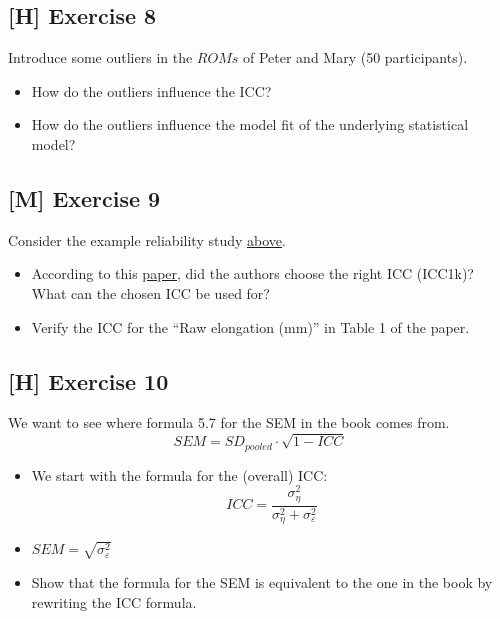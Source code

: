 \documentclass[
]{book}
\providecommand{\tightlist}{%
  \setlength{\itemsep}{0pt}\setlength{\parskip}{0pt}}
\begin{document}
\subsection{{[}H{]} Exercise 8}\label{exercise8}

Introduce some outliers in the \(ROMs\) of Peter and Mary (50 participants).

\begin{itemize}
\tightlist
\item
  How do the outliers influence the ICC?
\item
  How do the outliers influence the model fit of the underlying statistical model?
\end{itemize}

\subsection{{[}M{]} Exercise 9}\label{exercise9}

Consider the example reliability study \hyperref[example_RELStudy]{above}.

\begin{itemize}
\tightlist
\item
  According to this \href{https://www.sciencedirect.com/science/article/pii/S1556370716000158?via\%3Dihub}{paper},
  did the authors choose the right ICC (ICC1k)?
  What can the chosen ICC be used for?
\item
  Verify the ICC for the ``Raw elongation (mm)'' in Table 1 of the paper.
\end{itemize}

\subsection{{[}H{]} Exercise 10}\label{exercise10}

We want to see where formula 5.7 for the SEM in the book comes from.
\[SEM = SD_{pooled} \cdot \sqrt{1 - ICC}\]

\begin{itemize}
\item
  We start with the formula for the (overall) ICC:
  \[ICC = \frac{\sigma_{\eta}^2}{\sigma_{\eta}^2 + \sigma_{\varepsilon}^2}\]
\item
  \(SEM = \sqrt{\sigma_{\varepsilon}^2}\)
\item
  Show that the formula for the SEM is equivalent to the one in
  the book by rewriting the ICC formula.
\end{itemize}
\end{document}
